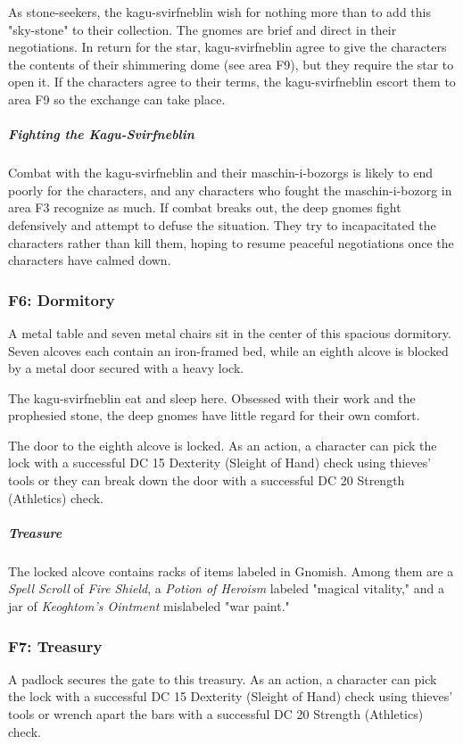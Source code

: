\documentclass[10pt,a4paper,twoside,bg=print,twocolumn,openany,nodeprecatedcode]{dndbook}
\begin{document}
As stone-seekers, the kagu-svirfneblin wish for nothing more than to add this "sky-stone" to their collection. The gnomes are brief and direct in their negotiations. In return for the star, kagu-svirfneblin agree to give the characters the contents of their shimmering dome (see area F9), but they require the star to open it. If the characters agree to their terms, the kagu-svirfneblin escort them to area F9 so the exchange can take place.

\subparagraph{Fighting the Kagu-Svirfneblin}
Combat with the kagu-svirfneblin and their maschin-i-bozorgs is likely to end poorly for the characters, and any characters who fought the maschin-i-bozorg in area F3 recognize as much. If combat breaks out, the deep gnomes fight defensively and attempt to defuse the situation. They try to incapacitated the characters rather than kill them, hoping to resume peaceful negotiations once the characters have calmed down.

\subsubsection{F6: Dormitory}
\begin{DndReadAloud}{}
A metal table and seven metal chairs sit in the center of this spacious dormitory. Seven alcoves each contain an iron-framed bed, while an eighth alcove is blocked by a metal door secured with a heavy lock.

\end{DndReadAloud}

The kagu-svirfneblin eat and sleep here. Obsessed with their work and the prophesied stone, the deep gnomes have little regard for their own comfort.

The door to the eighth alcove is locked. As an action, a character can pick the lock with a successful DC 15 Dexterity (Sleight of Hand) check using thieves' tools or they can break down the door with a successful DC 20 Strength (Athletics) check.

\subparagraph{Treasure}
The locked alcove contains racks of items labeled in Gnomish. Among them are a \textit{Spell Scroll} of \textit{Fire Shield}, a \textit{Potion of Heroism} labeled "magical vitality," and a jar of \textit{Keoghtom's Ointment} mislabeled "war paint."

\subsubsection{F7: Treasury}
A padlock secures the gate to this treasury. As an action, a character can pick the lock with a successful DC 15 Dexterity (Sleight of Hand) check using thieves' tools or wrench apart the bars with a successful DC 20 Strength (Athletics) check.
\end{document}
